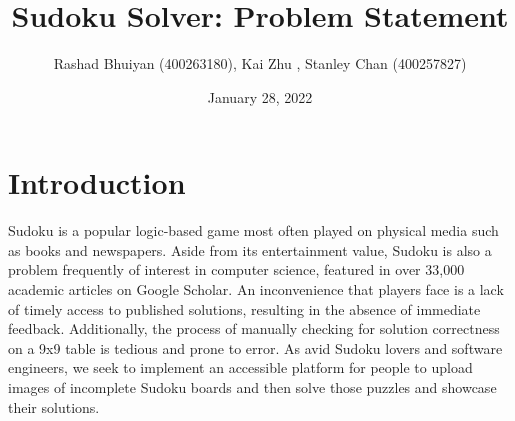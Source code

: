 \documentclass[11pt]{article}
\title{Sudoku Solver: Problem Statement}
\author{Rashad Bhuiyan (400263180), Kai Zhu , Stanley Chan (400257827)}
\date{January 28, 2022}
\begin{document}
\maketitle

\section{Introduction}
Sudoku is a popular logic-based game most often played on physical media such as books and newspapers. Aside from its entertainment value, Sudoku is also a problem frequently of interest in computer science, featured in over 33,000 academic articles on Google Scholar. An inconvenience that players face is a lack of timely access to published solutions, resulting in the absence of immediate feedback. Additionally, the process of manually checking for solution correctness on a 9x9 table is tedious and prone to error. As avid Sudoku lovers and software engineers, we seek to implement an accessible platform for people to upload images of incomplete Sudoku boards and then solve those puzzles and showcase their solutions.
\end{document}
